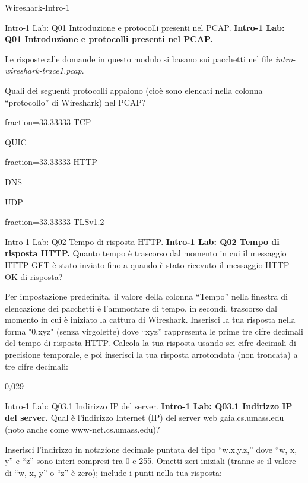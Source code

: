 \documentclass[a4paper]{article}
\begin{document}
\begin{quiz}{Wireshark-Intro-1}

\begin{multi}[points=1,multiple]{Intro-1 Lab: Q01 Introduzione e protocolli presenti nel PCAP.}
\textbf{Intro-1 Lab: Q01 Introduzione e protocolli presenti nel PCAP.}

Le risposte alle domande in questo modulo si basano sui pacchetti nel file \emph{intro-wireshark-trace1.pcap}.

Quali dei seguenti protocolli appaiono (cioè sono elencati nella colonna ``protocollo'' di Wireshark) nel PCAP?

\item[fraction=33.33333] TCP
\item QUIC
\item[fraction=33.33333] HTTP
\item DNS
\item UDP
\item[fraction=33.33333] TLSv1.2
\end{multi}

\begin{shortanswer}[points=1]{Intro-1 Lab: Q02 Tempo di risposta HTTP.}
\textbf{Intro-1 Lab: Q02 Tempo di risposta HTTP.}
Quanto tempo è trascorso dal momento in cui il messaggio HTTP GET è stato inviato fino a quando è stato ricevuto il messaggio HTTP OK di risposta?

Per impostazione predefinita, il valore della colonna ``Tempo'' nella finestra di elencazione dei pacchetti è l'ammontare di tempo, in secondi, trascorso dal momento in cui è iniziato la cattura di Wireshark. Inserisci la tua risposta nella forma "0,xyz" (senza virgolette) dove ``xyz'' rappresenta le prime tre cifre decimali del tempo di risposta HTTP. Calcola la tua risposta usando sei cifre decimali di precisione temporale, e poi inserisci la tua risposta arrotondata (non troncata) a tre cifre decimali:

\item 0,029
\end{shortanswer}

\begin{shortanswer}[points=1]{Intro-1 Lab: Q03.1 Indirizzo IP del server.}
\textbf{Intro-1 Lab: Q03.1 Indirizzo IP del server.}
Qual è l'indirizzo Internet (IP) del server web gaia.cs.umass.edu (noto anche come www-net.cs.umass.edu)?

Inserisci l'indirizzo in notazione decimale puntata del tipo ``w.x.y.z,'' dove ``w, x, y'' e ``z'' sono interi compresi tra 0 e 255. Ometti zeri iniziali (tranne se il valore di ``w, x, y'' o ``z'' è zero); include i punti nella tua risposta:


\end{shortanswer}
\end{quiz}
\end{document}
